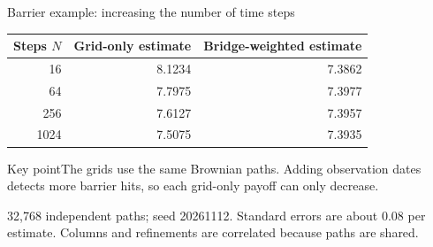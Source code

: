 \documentclass[handout,10pt,t,aspectratio=169]{beamer}
\newenvironment{keybox}{\begin{exampleblock}{Key point}}{\end{exampleblock}}
\newcommand{\source}[1]{\vfill{\scriptsize\color{gray}#1\par}}
\begin{document}
\begin{frame}{Barrier example: increasing the number of time steps}

    \begin{center}\begin{tabular}{rrr}
    \toprule Steps \(N\) & Grid-only estimate & Bridge-weighted estimate\\\midrule
    16 & 8.1234 & 7.3862\\
64 & 7.7975 & 7.3977\\
256 & 7.6127 & 7.3957\\
1024 & 7.5075 & 7.3935\\
    \bottomrule\end{tabular}\end{center}
    \begin{keybox}The grids use the same Brownian paths. Adding observation dates detects
    more barrier hits, so each grid-only payoff can only decrease.\end{keybox}
    \source{32,768 independent paths; seed 20261112. Standard errors are about 0.08 per estimate.
    Columns and refinements are correlated because paths are shared.}
\end{frame}
\end{document}
